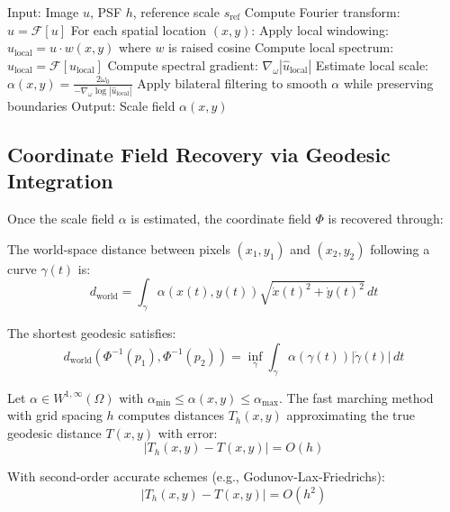\documentclass[twocolumn,11pt]{article}
\begin{document}
\begin{algorithm}
\caption{Spectral Scale Field Estimation}
\begin{algorithmic}[1]
\State Input: Image $u$, PSF $h$, reference scale $s_{\text{ref}}$
\State Compute Fourier transform: $\hat{u} = \mathcal{F}[u]$
\State For each spatial location $(x,y)$:
  \State \quad Apply local windowing: $u_{\text{local}} = u \cdot w(x,y)$ where $w$ is raised cosine
  \State \quad Compute local spectrum: $\hat{u}_{\text{local}} = \mathcal{F}[u_{\text{local}}]$
  \State \quad Compute spectral gradient: $\nabla_\omega |\hat{u}_{\text{local}}|$
  \State \quad Estimate local scale: $\alpha(x,y) = \frac{2\omega_0}{-\nabla_\omega \log|\hat{u}_{\text{local}}|}$
\State \quad Apply bilateral filtering to smooth $\alpha$ while preserving boundaries
\State Output: Scale field $\alpha(x,y)$
\end{algorithmic}
\end{algorithm}

\subsection{Coordinate Field Recovery via Geodesic Integration}

Once the scale field $\alpha$ is estimated, the coordinate field $\Phi$ is recovered through:

\begin{definition}
The world-space distance between pixels $(x_1, y_1)$ and $(x_2, y_2)$ following a curve $\gamma(t)$ is:
\begin{equation}
d_{\text{world}} = \int_\gamma \alpha(x(t), y(t)) \sqrt{\dot{x}(t)^2 + \dot{y}(t)^2} \, dt
\end{equation}

The shortest geodesic satisfies:
\begin{equation}
d_{\text{world}}(\Phi^{-1}(p_1), \Phi^{-1}(p_2)) = \inf_\gamma \int_\gamma \alpha(\gamma(t)) |\dot{\gamma}(t)| \, dt
\end{equation}
\end{definition}

\begin{theorem}
Let $\alpha \in W^{1,\infty}(\Omega)$ with $\alpha_{\min} \leq \alpha(x,y) \leq \alpha_{\max}$. The fast marching method with grid spacing $h$ computes distances $T_h(x,y)$ approximating the true geodesic distance $T(x,y)$ with error:
\begin{equation}
|T_h(x,y) - T(x,y)| = O(h)
\end{equation}

With second-order accurate schemes (e.g., Godunov-Lax-Friedrichs):
\begin{equation}
|T_h(x,y) - T(x,y)| = O(h^2)
\end{equation}
\end{theorem}
\end{document}
